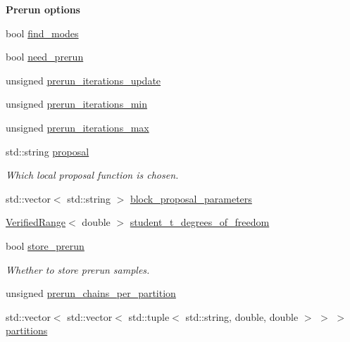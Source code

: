 \begin{Indent}{\bf Prerun options}\par
{\em \label{_amgrp69aa39847c44de1c77ee7280aacb4e83}
 }\begin{DoxyCompactItemize}
\item 
bool \hyperlink{classeos_1_1MarkovChainSampler_1_1Config_a04afa9d1080b945fe1702b4d8d5fb2bb}{find\_\-modes}
\item 
bool \hyperlink{classeos_1_1MarkovChainSampler_1_1Config_acd202b210ff8f364eda6aacdd8958f8a}{need\_\-prerun}
\item 
unsigned \hyperlink{classeos_1_1MarkovChainSampler_1_1Config_aac94024909568d9ca6e59108db400c6d}{prerun\_\-iterations\_\-update}
\item 
unsigned \hyperlink{classeos_1_1MarkovChainSampler_1_1Config_af76602d7053b0f599295e1175718cb22}{prerun\_\-iterations\_\-min}
\item 
unsigned \hyperlink{classeos_1_1MarkovChainSampler_1_1Config_aed5faf2c2cd03d33d5acb79fc16132a4}{prerun\_\-iterations\_\-max}
\item 
std::string \hyperlink{classeos_1_1MarkovChainSampler_1_1Config_a7184404972d7e56da2a78218555c1f97}{proposal}
\begin{DoxyCompactList}\small\item\em Which local proposal function is chosen. \item\end{DoxyCompactList}\item 
std::vector$<$ std::string $>$ \hyperlink{classeos_1_1MarkovChainSampler_1_1Config_af6ef8839a138b5f2ba25ed00c9949ecf}{block\_\-proposal\_\-parameters}
\item 
\hyperlink{classeos_1_1VerifiedRange}{VerifiedRange}$<$ double $>$ \hyperlink{classeos_1_1MarkovChainSampler_1_1Config_a7a3619bea51ea7edeb15dc2e8c614213}{student\_\-t\_\-degrees\_\-of\_\-freedom}
\item 
bool \hyperlink{classeos_1_1MarkovChainSampler_1_1Config_a9fecfcf6c6ce24b34d1370dd1d222d06}{store\_\-prerun}
\begin{DoxyCompactList}\small\item\em Whether to store prerun samples. \item\end{DoxyCompactList}\item 
unsigned \hyperlink{classeos_1_1MarkovChainSampler_1_1Config_a4b8b7f5ca38ffd97f0cbb431237a2872}{prerun\_\-chains\_\-per\_\-partition}
\item 
std::vector$<$ std::vector$<$ std::tuple$<$ std::string, double, double $>$ $>$ $>$ \hyperlink{classeos_1_1MarkovChainSampler_1_1Config_a86b460f2153f55c4d5763f50f5bdba95}{partitions}
\end{DoxyCompactItemize}
\end{Indent}

